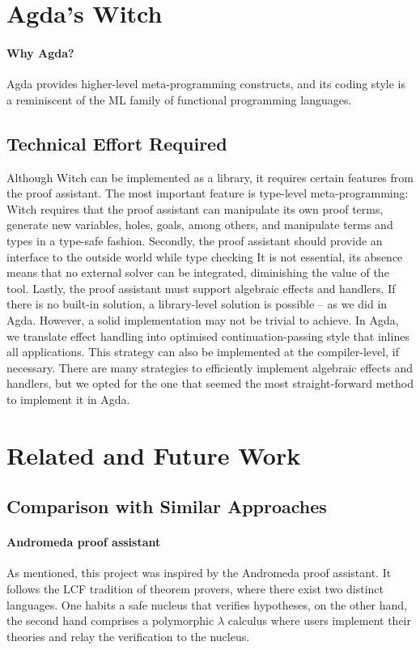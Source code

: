 \documentclass[sigconfl]{acmart}
\begin{document}
\section{Agda's Witch} \label{witch-agda}

\paragraph{Why Agda?} Agda provides higher-level meta-programming constructs, and
its coding style is a reminiscent of the ML family of functional programming languages.

\subsection{Technical Effort Required} \label{tech-details}

Although Witch can be implemented as a library, it requires certain features
from the proof assistant. The most important feature is type-level
meta-programming: Witch requires that the proof assistant can manipulate its own
proof terms, generate new variables, holes, goals, among others, and manipulate
terms and types in a type-safe fashion.
Secondly, the proof assistant should provide an interface to the outside world
while type checking
It is not essential, its absence means that no external solver can be
integrated, diminishing the value of the tool.
Lastly, the proof assistant must support algebraic effects and handlers. If there
is no built-in solution, a library-level solution is possible -- as we did in
Agda. However, a solid implementation may not be trivial to achieve. In Agda,
we translate effect handling into optimised continuation-passing style that inlines
all applications. This strategy can also be implemented at the compiler-level,
if necessary. There are many strategies to efficiently implement algebraic effects and handlers, but we
opted for the one that seemed the most straight-forward method to implement it in Agda.

\section{Related and Future Work}

\subsection{Comparison with Similar Approaches}

\paragraph{Andromeda proof assistant} As mentioned, this project was inspired by the
Andromeda proof assistant. It follows the LCF tradition of theorem provers,
where there exist two distinct languages. One habits a safe nucleus that
verifies hypotheses, on the other hand, the second hand comprises a polymorphic
$\lambda$ calculus where users implement their theories and relay the
verification to the nucleus.
\end{document}
